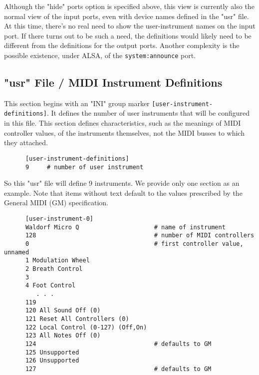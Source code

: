    Although the "hide" ports option is specified above, this view is
   currently also the normal view of the input ports, even with device names
   defined in the "usr" file.
   At this time, there's no real need to show the user-instrument names
   on the input port.  If there turns out to be such a need, the definitions
   would likely need to be different from the definitions for the output ports.
   Another complexity is the possible existence, under ALSA, of the
   \texttt{system:announce} port.

\subsection{"usr" File / MIDI Instrument Definitions}
\label{subsec:seq66_usr_file_midi_instrument_definitions}

   This section begins with an
   "INI" group marker \texttt{[user-instrument-definitions]}.
   It defines the number of user instruments that will be configured in this
   file.  This section defines characteristics, such as
   the meanings of MIDI controller values, of the instruments themselves,
   not the MIDI busses to which they attached.

   \begin{verbatim}
      [user-instrument-definitions]
      9     # number of user instrument
   \end{verbatim}

   So this "usr" file will define 9 instruments.  We provide only one section
   as an example.  Note that items without text default to the values
   prescribed by the General MIDI (GM) specification.

   \begin{verbatim}
      [user-instrument-0]
      Waldorf Micro Q                     # name of instrument
      128                                 # number of MIDI controllers
      0                                   # first controller value, unnamed
      1 Modulation Wheel
      2 Breath Control
      3 
      4 Foot Control
         . . .
      119
      120 All Sound Off (0)
      121 Reset All Controllers (0)
      122 Local Control (0-127) (Off,On)
      123 All Notes Off (0)
      124                                 # defaults to GM
      125 Unsupported
      126 Unsupported
      127                                 # defaults to GM
   \end{verbatim}

